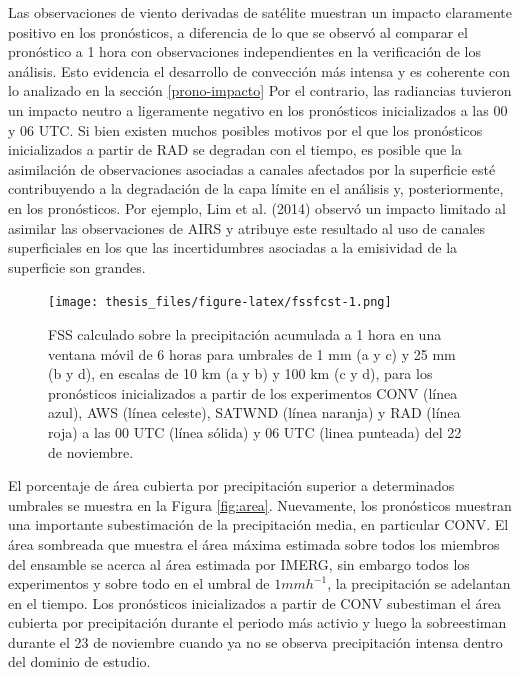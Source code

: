 \documentclass[12pt,oneside]{reedthesis}
\begin{document}
Las observaciones de viento derivadas de satélite muestran un impacto claramente positivo en los pronósticos, a diferencia de lo que se observó al comparar el pronóstico a 1 hora con observaciones independientes en la verificación de los análisis. Esto evidencia el desarrollo de convección más intensa y es coherente con lo analizado en la sección \ref{prono-impacto} Por el contrario, las radiancias tuvieron un impacto neutro a ligeramente negativo en los pronósticos inicializados a las 00 y 06 UTC. Si bien existen muchos posibles motivos por el que los pronósticos inicializados a partir de RAD se degradan con el tiempo, es posible que la asimilación de observaciones asociadas a canales afectados por la superficie esté contribuyendo a la degradación de la capa límite en el análisis y, posteriormente, en los pronósticos. Por ejemplo, Lim et al. (2014) observó un impacto limitado al asimilar las observaciones de AIRS y atribuye este resultado al uso de canales superficiales en los que las incertidumbres asociadas a la emisividad de la superficie son grandes.


\begin{figure}
\centering
\texttt{[image: thesis\_files/figure-latex/fssfcst-1.png]}
\caption{\label{fig:fssfcst}FSS calculado sobre la precipitación acumulada a 1 hora en una ventana móvil de 6 horas para umbrales de 1 mm (a y c) y 25 mm (b y d), en escalas de 10 km (a y b) y 100 km (c y d), para los pronósticos inicializados a partir de los experimentos CONV (línea azul), AWS (línea celeste), SATWND (línea naranja) y RAD (línea roja) a las 00 UTC (línea sólida) y 06 UTC (linea punteada) del 22 de noviembre.}
\end{figure}
El porcentaje de área cubierta por precipitación superior a determinados umbrales se muestra en la Figura \ref{fig:area}. Nuevamente, los pronósticos muestran una importante subestimación de la precipitación media, en particular CONV. El área sombreada que muestra el área máxima estimada sobre todos los miembros del ensamble se acerca al área estimada por IMERG, sin embargo todos los experimentos y sobre todo en el umbral de \(1 mmh^{-1}\), la precipitación se adelantan en el tiempo. Los pronósticos inicializados a partir de CONV subestiman el área cubierta por precipitación durante el periodo más activio y luego la sobreestiman durante el 23 de noviembre cuando ya no se observa precipitación intensa dentro del dominio de estudio.
\end{document}
